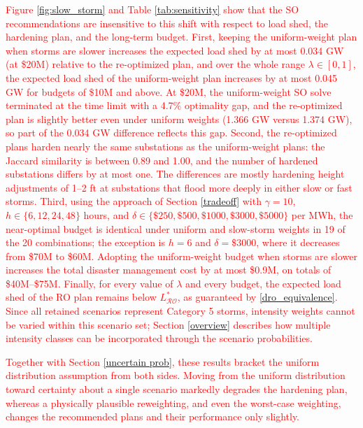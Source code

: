 \documentclass[authoryear,preprint,review,12pt]{elsarticle}\usepackage{amssymb}
\begin{document}
\textcolor{red}{Figure \ref{fig:slow_storm} and Table \ref{tab:sensitivity} show that the SO recommendations are insensitive to this shift with respect to load shed, the hardening plan, and the long-term budget. First, keeping the uniform-weight plan when storms are slower increases the expected load shed by at most 0.034 GW (at \$20M) relative to the re-optimized plan, and over the whole range $\lambda \in [0,1]$, the expected load shed of the uniform-weight plan increases by at most 0.045 GW for budgets of \$10M and above. At \$20M, the uniform-weight SO solve terminated at the time limit with a 4.7\% optimality gap, and the re-optimized plan is slightly better even under uniform weights (1.366 GW versus 1.374 GW), so part of the 0.034 GW difference reflects this gap. Second, the re-optimized plans harden nearly the same substations as the uniform-weight plans: the Jaccard similarity is between 0.89 and 1.00, and the number of hardened substations differs by at most one. The differences are mostly hardening height adjustments of 1--2 ft at substations that flood more deeply in either slow or fast storms. Third, using the approach of Section \ref{tradeoff} with $\gamma = 10$, $h \in \{6, 12, 24, 48\}$ hours, and $\delta \in \{\$250, \$500, \$1000, \$3000, \$5000\}$ per MWh, the near-optimal budget is identical under uniform and slow-storm weights in 19 of the 20 combinations; the exception is $h = 6$ and $\delta = \$3000$, where it decreases from \$70M to \$60M. Adopting the uniform-weight budget when storms are slower increases the total disaster management cost by at most \$0.9M, on totals of \$40M--\$75M. Finally, for every value of $\lambda$ and every budget, the expected load shed of the RO plan remains below $L^*_{\mathcal{RO}}$, as guaranteed by \eqref{dro_equivalence}. Since all retained scenarios represent Category 5 storms, intensity weights cannot be varied within this scenario set; Section \ref{overview} describes how multiple intensity classes can be incorporated through the scenario probabilities.}

\textcolor{red}{Together with Section \ref{uncertain prob}, these results bracket the uniform distribution assumption from both sides. Moving from the uniform distribution toward certainty about a single scenario markedly degrades the hardening plan, whereas a physically plausible reweighting, and even the worst-case weighting, changes the recommended plans and their performance only slightly.}


\end{document}
